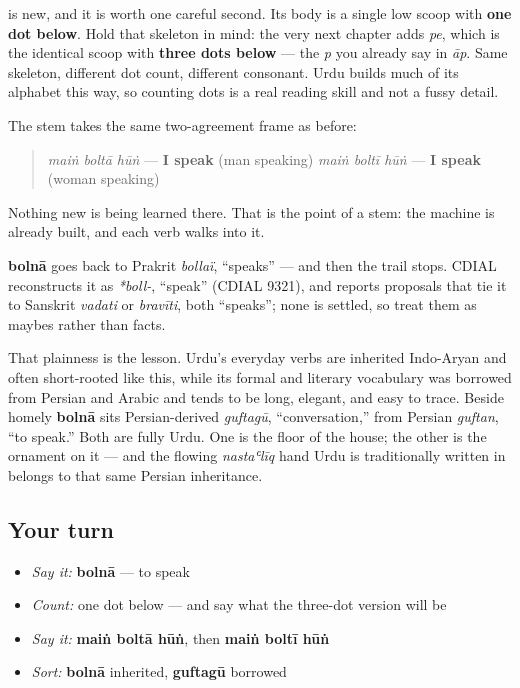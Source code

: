 \textbf{} is new, and it is worth one careful second. Its body is a single low scoop with \textbf{one dot below}. Hold that skeleton in mind: the very next chapter adds \emph{pe}, which is the identical scoop with \textbf{three dots below} — the \emph{p} you already say in \emph{āp}. Same skeleton, different dot count, different consonant. Urdu builds much of its alphabet this way, so counting dots is a real reading skill and not a fussy detail.

\begin{grammarlens}[title={Grammar Lens: put it in the frame}]
The stem takes the same two-agreement frame as before:

\begin{quote}
\emph{maiṅ boltā hūṅ} — \textbf{I speak} (man speaking) \emph{maiṅ boltī hūṅ} — \textbf{I speak} (woman speaking)
\end{quote}

Nothing new is being learned there. That is the point of a stem: the machine is already built, and each verb walks into it.
\end{grammarlens}

\begin{cousinweb}
\textbf{bolnā} goes back to Prakrit \emph{bollaï}, “speaks” — and then the trail stops. CDIAL reconstructs it as \emph{*boll-}, “speak” (CDIAL 9321), and reports proposals that tie it to Sanskrit \emph{vadati} or \emph{bravīti}, both “speaks”; none is settled, so treat them as maybes rather than facts.

That plainness is the lesson. Urdu's everyday verbs are inherited Indo-Aryan and often short-rooted like this, while its formal and literary vocabulary was borrowed from Persian and Arabic and tends to be long, elegant, and easy to trace. Beside homely \textbf{bolnā} sits Persian-derived \emph{guftagū}, “conversation,” from Persian \emph{guftan}, “to speak.” Both are fully Urdu. One is the floor of the house; the other is the ornament on it — and the flowing \emph{nastaʿlīq} hand Urdu is traditionally written in belongs to that same Persian inheritance.
\end{cousinweb}

\subsection*{Your turn}
\begin{itemize}
\raggedright
  \item \emph{Say it:} \textbf{bolnā} — to speak
  \item \emph{Count:} \textbf{} one dot below — and say what the three-dot version will be
  \item \emph{Say it:} \textbf{maiṅ boltā hūṅ}, then \textbf{maiṅ boltī hūṅ}
  \item \emph{Sort:} \textbf{bolnā} inherited, \textbf{guftagū} borrowed
\end{itemize}

